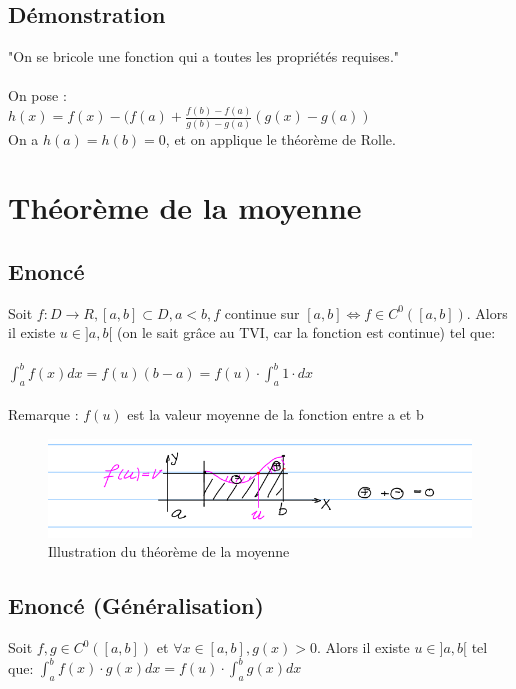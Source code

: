 \documentclass{article}
\begin{document}
\subsection{Démonstration}

"On se bricole une fonction qui a toutes les propriétés requises."\\\\
On pose :\\
$ h(x) = f(x) - (f(a) + \frac{f(b) - f(a)}{g(b) - g(a)}(g(x) - g(a)) $\\
On a $ h(a) = h(b) = 0 $, et on applique le théorème de Rolle.

\newpage

\section{Théorème de la moyenne}

\subsection{Enoncé}

Soit $ f: D \to R, [a, b] \subset D, a < b, f $ continue sur $ [a, b] \Leftrightarrow f \in C^0([a, b])$. Alors il existe $ u \in ]a, b[$ (on le sait grâce au TVI, car la fonction est continue) tel que:\\\\
$ \int_{a}^bf(x)dx = f(u)(b - a) = f(u) \cdot \int_{a}^b 1\cdot dx$\\\\
Remarque : $f(u)$ est la valeur moyenne de la fonction entre a et b

\begin{figure}[htp]
    \centering
    \includegraphics[width=0.8\linewidth]{Images/moyenne.png}
    \caption{Illustration du théorème de la moyenne}
    \label{fig:enter-label}
\end{figure}

\subsection{Enoncé (Généralisation)}

Soit $ f, g \in C^0([a, b]) $ et $ \forall x \in [a, b], g(x) > 0. $ Alors il existe $ u \in ]a, b[ $ tel que:
$ \int_{a}^b f(x)\cdot g(x)dx = f(u) \cdot \int_{a}^b g(x)dx$
\end{document}

